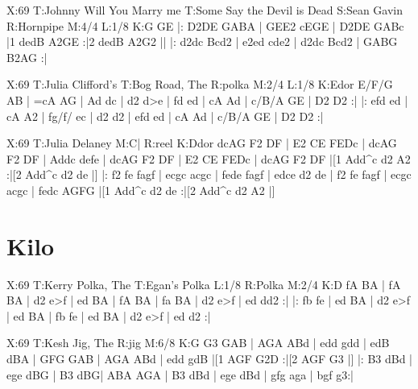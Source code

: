 \documentclass{article}
\begin{document}
\begin{abc}[name]
X:69
T:Johnny Will You Marry me
T:Some Say the Devil is Dead
S:Sean Gavin
R:Hornpipe
M:4/4
L:1/8
K:G
GE |: D2DE GABA | GEE2 cEGE | D2DE GABc |1 dedB A2GE :|2 dedB A2G2 ||
|: d2dc Bcd2 | e2ed cde2 | d2dc Bcd2 | GABG B2AG :|
\end{abc}

\begin{abc}[name]
X:69
T:Julia Clifford's
T:Bog Road, The
R:polka
M:2/4
L:1/8
K:Edor
E/F/G AB | =cA AG | Ad dc | d2 d>e |
fd ed | cA Ad | c/B/A GE | D2 D2 :|
|: {e}fd ed | cA A2 | fg/f/ ec | d2 d2 |
{e}fd ed | cA Ad | c/B/A GE | D2 D2 :|
\end{abc}

\begin{abc}[name]
X:69
T:Julia Delaney
M:C|
R:reel
K:Ddor
dcAG F2 DF | E2 CE FEDc | dcAG F2 DF | Addc defe |
dcAG F2 DF | E2 CE FEDc | dcAG F2 DF |[1 Add^c d2 A2 :|[2 Add^c d2 de |]
|: f2 fe fagf | ecgc acgc | fede fagf | edce d2 de |
f2 fe fagf | ecgc acgc | fedc AGFG |[1 Add^c d2 de :|[2 Add^c d2 A2 |]
\end{abc}

\section{Kilo}

\begin{abc}[name]
X:69
T:Kerry Polka, The
T:Egan's Polka
L:1/8
R:Polka
M:2/4
K:D
fA BA | fA BA | d2 e>f | ed BA |
fA BA | fa BA | d2 e>f | ed dd2 :|
|: fb fe | ed BA | d2 e>f | ed BA |
fb fe | ed BA | d2 e>f | ed d2 :|
\end{abc}

\begin{abc}[name]
X:69
T:Kesh Jig, The
R:jig
M:6/8
K:G
G3 GAB | AGA ABd | edd gdd | edB dBA |
GFG GAB | AGA ABd | edd gdB |[1 AGF G2D :|[2 AGF G3 |]
|: B3 dBd | ege dBG | B3 dBG| ABA AGA |
B3 dBd | ege dBd | gfg aga | bgf g3:|
\end{abc}
\end{document}
